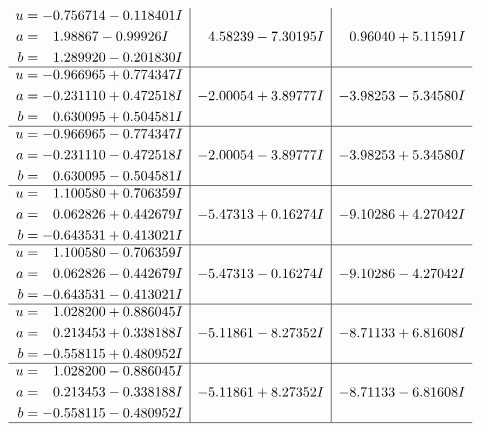 \documentclass[1p]{elsarticle_modified}
\theoremstyle{definition}
\begin{document}
$$\begin{array}{c|c|c}
\begin{aligned}
u &= -0.756714 - 0.118401 I \\
a &= \phantom{-}1.98867 - 0.99926 I \\
b &= \phantom{-}1.289920 - 0.201830 I\end{aligned}
 & \phantom{-}4.58239 - 7.30195 I & \phantom{-}0.96040 + 5.11591 I \\ \hline\begin{aligned}
u &= -0.966965 + 0.774347 I \\
a &= -0.231110 + 0.472518 I \\
b &= \phantom{-}0.630095 + 0.504581 I\end{aligned}
 & -2.00054 + 3.89777 I & -3.98253 - 5.34580 I \\ \hline\begin{aligned}
u &= -0.966965 - 0.774347 I \\
a &= -0.231110 - 0.472518 I \\
b &= \phantom{-}0.630095 - 0.504581 I\end{aligned}
 & -2.00054 - 3.89777 I & -3.98253 + 5.34580 I \\ \hline\begin{aligned}
u &= \phantom{-}1.100580 + 0.706359 I \\
a &= \phantom{-}0.062826 + 0.442679 I \\
b &= -0.643531 + 0.413021 I\end{aligned}
 & -5.47313 + 0.16274 I & -9.10286 + 4.27042 I \\ \hline\begin{aligned}
u &= \phantom{-}1.100580 - 0.706359 I \\
a &= \phantom{-}0.062826 - 0.442679 I \\
b &= -0.643531 - 0.413021 I\end{aligned}
 & -5.47313 - 0.16274 I & -9.10286 - 4.27042 I \\ \hline\begin{aligned}
u &= \phantom{-}1.028200 + 0.886045 I \\
a &= \phantom{-}0.213453 + 0.338188 I \\
b &= -0.558115 + 0.480952 I\end{aligned}
 & -5.11861 - 8.27352 I & -8.71133 + 6.81608 I \\ \hline\begin{aligned}
u &= \phantom{-}1.028200 - 0.886045 I \\
a &= \phantom{-}0.213453 - 0.338188 I \\
b &= -0.558115 - 0.480952 I\end{aligned}
 & -5.11861 + 8.27352 I & -8.71133 - 6.81608 I\\
 \hline 
 \end{array}$$\newpage\newpage\renewcommand{\arraystretch}{1}
\end{document}
